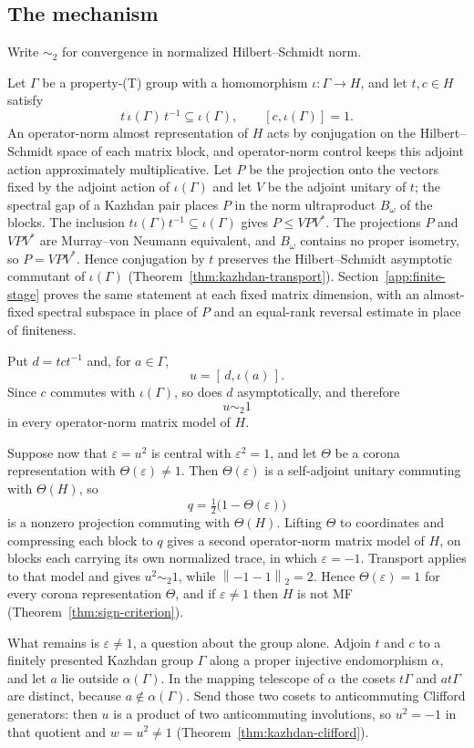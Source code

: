 \documentclass[11pt]{amsart}
\theoremstyle{definition}
\theoremstyle{remark}
\theoremstyle{plain}
\newcommand{\hsnorm}[1]{\left\lVert #1\right\rVert_{2}}
\begin{document}
\subsection*{The mechanism}
Write $\sim_2$ for convergence in normalized Hilbert--Schmidt norm.

Let $\Gamma$ be a property-\textup{(T)} group with a homomorphism
$\iota\colon\Gamma\to H$, and let $t,c\in H$ satisfy
\[
 t\,\iota(\Gamma)\,t^{-1}\subseteq\iota(\Gamma),\qquad
 [c,\iota(\Gamma)]=1 .
\]
An operator-norm almost representation of $H$ acts by conjugation on
the Hilbert--Schmidt space of each matrix block, and operator-norm
control keeps this adjoint action approximately multiplicative.  Let
$P$ be the projection onto the vectors fixed by the adjoint action of
$\iota(\Gamma)$ and let $V$ be the adjoint unitary of $t$; the spectral
gap of a Kazhdan pair places $P$ in the norm ultraproduct $B_\omega$ of
the blocks.  The inclusion $t\iota(\Gamma)t^{-1}\subseteq\iota(\Gamma)$
gives $P\le VPV^*$.  The projections $P$ and $VPV^*$ are Murray--von
Neumann equivalent, and $B_\omega$ contains no proper isometry, so
$P=VPV^*$.  Hence conjugation by $t$ preserves the Hilbert--Schmidt
asymptotic commutant of $\iota(\Gamma)$
(Theorem~\ref{thm:kazhdan-transport}).
Section~\ref{app:finite-stage} proves the same statement at each fixed
matrix dimension, with an almost-fixed spectral subspace in place of
$P$ and an equal-rank reversal estimate in place of finiteness.

Put $d=tct^{-1}$ and, for $a\in\Gamma$,
\[
 u=[\,d,\iota(a)\,].
\]
Since $c$ commutes with $\iota(\Gamma)$, so does $d$ asymptotically,
and therefore
\[
 u\sim_2 1
\]
in every operator-norm matrix model of $H$.

Suppose now that $\varepsilon=u^2$ is central with $\varepsilon^2=1$,
and let $\Theta$ be a corona representation with
$\Theta(\varepsilon)\ne1$.  Then $\Theta(\varepsilon)$ is a
self-adjoint unitary commuting with $\Theta(H)$, so
\[
 q=\tfrac12\bigl(1-\Theta(\varepsilon)\bigr)
\]
is a nonzero projection commuting with $\Theta(H)$.  Lifting $\Theta$
to coordinates and compressing each block to $q$ gives a second
operator-norm matrix model of $H$, on blocks each carrying its own
normalized trace, in which $\varepsilon=-1$.  Transport applies to that
model and gives $u^2\sim_2 1$, while $\hsnorm{-1-1}=2$.  Hence
$\Theta(\varepsilon)=1$ for every corona representation $\Theta$, and
if $\varepsilon\ne1$ then $H$ is not MF
(Theorem~\ref{thm:sign-criterion}).

What remains is $\varepsilon\ne1$, a question about the group alone.
Adjoin $t$ and $c$ to a finitely presented Kazhdan group $\Gamma$
along a proper injective endomorphism $\alpha$, and let $a$ lie
outside $\alpha(\Gamma)$.  In the mapping telescope of $\alpha$ the
cosets $t\Gamma$ and $at\Gamma$ are distinct, because
$a\notin\alpha(\Gamma)$.  Send those two cosets to anticommuting
Clifford generators: then $u$ is a product of two anticommuting
involutions, so $u^2=-1$ in that quotient and $w=u^2\ne1$
(Theorem~\ref{thm:kazhdan-clifford}).
\end{document}
